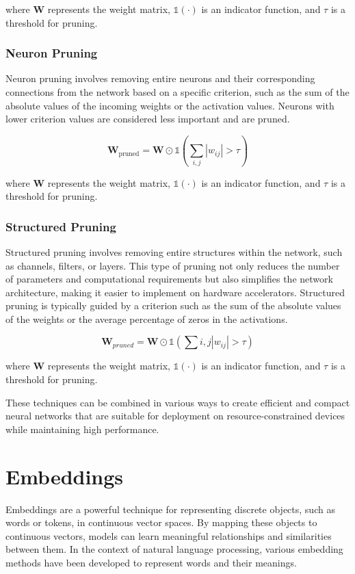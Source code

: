 \documentclass[12pt]{article}
\begin{document}
where $\textbf{W}$ represents the weight matrix, $\mathbb{1}(\cdot)$ is an indicator function, and $\tau$ is a threshold for pruning.

\subsubsection{Neuron Pruning}

Neuron pruning involves removing entire neurons and their corresponding connections from the network based on a specific criterion, such as the sum of the absolute values of the incoming weights or the activation values. Neurons with lower criterion values are considered less important and are pruned.

\begin{equation}
\textbf{W}_{\text{pruned}} = \textbf{W} \odot \mathbb{1}(\sum_{i,j} |w_{ij}| > \tau)
\end{equation}

where $\textbf{W}$ represents the weight matrix, $\mathbb{1}(\cdot)$ is an indicator function, and $\tau$ is a threshold for pruning.

\subsubsection{Structured Pruning}

Structured pruning involves removing entire structures within the network, such as channels, filters, or layers. This type of pruning not only reduces the number of parameters and computational requirements but also simplifies the network architecture, making it easier to implement on hardware accelerators. Structured pruning is typically guided by a criterion such as the sum of the absolute values of the weights or the average percentage of zeros in the activations.

\begin{equation}
\textbf{W}_{pruned} = \textbf{W} \odot \mathbb{1}(\sum{i,j} |w_{ij}| > \tau)
\end{equation}

where $\textbf{W}$ represents the weight matrix, $\mathbb{1}(\cdot)$ is an indicator function, and $\tau$ is a threshold for pruning.

These techniques can be combined in various ways to create efficient and compact neural networks that are suitable for deployment on resource-constrained devices while maintaining high performance.

\section{Embeddings}
Embeddings are a powerful technique for representing discrete objects, such as words or tokens, in continuous vector spaces. By mapping these objects to continuous vectors, models can learn meaningful relationships and similarities between them. In the context of natural language processing, various embedding methods have been developed to represent words and their meanings.
\end{document}
